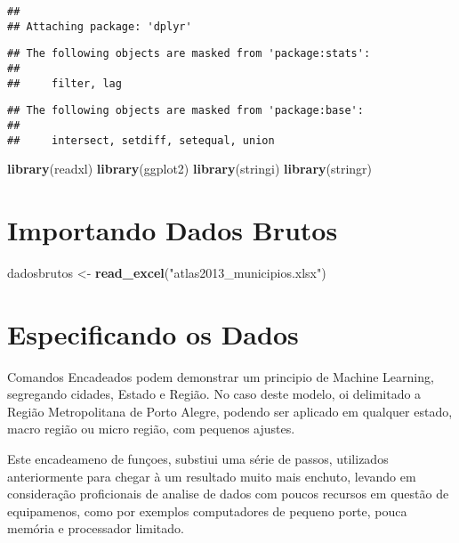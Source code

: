 \documentclass[]{article}
\newenvironment{Shaded}{\begin{snugshade}}{\end{snugshade}}
\newcommand{\KeywordTok}[1]{\textcolor[rgb]{0.13,0.29,0.53}{\textbf{#1}}}
\newcommand{\StringTok}[1]{\textcolor[rgb]{0.31,0.60,0.02}{#1}}
\newcommand{\NormalTok}[1]{#1}
\begin{document}
\begin{verbatim}
## 
## Attaching package: 'dplyr'
\end{verbatim}

\begin{verbatim}
## The following objects are masked from 'package:stats':
## 
##     filter, lag
\end{verbatim}

\begin{verbatim}
## The following objects are masked from 'package:base':
## 
##     intersect, setdiff, setequal, union
\end{verbatim}

\begin{Shaded}
\begin{Highlighting}[]
\KeywordTok{library}\NormalTok{(readxl)}
\KeywordTok{library}\NormalTok{(ggplot2)}
\KeywordTok{library}\NormalTok{(stringi)}
\KeywordTok{library}\NormalTok{(stringr)}
\end{Highlighting}
\end{Shaded}

\section{Importando Dados Brutos}\label{importando-dados-brutos}

\begin{Shaded}
\begin{Highlighting}[]
\NormalTok{dadosbrutos <-}\StringTok{ }\KeywordTok{read_excel}\NormalTok{(}\StringTok{"atlas2013_municipios.xlsx"}\NormalTok{)}
\end{Highlighting}
\end{Shaded}

\section{Especificando os Dados}\label{especificando-os-dados}

Comandos Encadeados podem demonstrar um principio de Machine Learning,
segregando cidades, Estado e Região. No caso deste modelo, oi delimitado
a Região Metropolitana de Porto Alegre, podendo ser aplicado em qualquer
estado, macro região ou micro região, com pequenos ajustes.

Este encadeameno de funçoes, substiui uma série de passos, utilizados
anteriormente para chegar à um resultado muito mais enchuto, levando em
consideração proficionais de analise de dados com poucos recursos em
questão de equipamenos, como por exemplos computadores de pequeno porte,
pouca memória e processador limitado.
\end{document}

